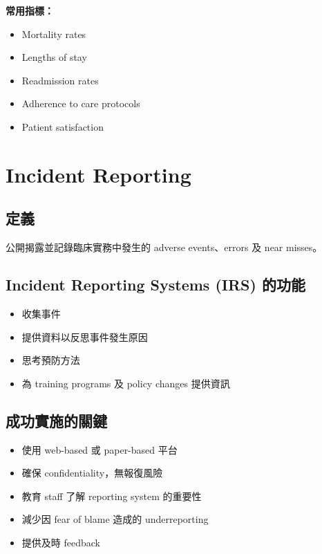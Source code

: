 \documentclass[12pt,a4paper]{article}
\begin{document}
\textbf{常用指標：}
\begin{itemize}
    \item Mortality rates
    \item Lengths of stay
    \item Readmission rates
    \item Adherence to care protocols
    \item Patient satisfaction
\end{itemize}

\section{Incident Reporting}

\subsection{定義}

公開揭露並記錄臨床實務中發生的 adverse events、errors 及 near misses。

\subsection{Incident Reporting Systems (IRS) 的功能}

\begin{itemize}
    \item 收集事件
    \item 提供資料以反思事件發生原因
    \item 思考預防方法
    \item 為 training programs 及 policy changes 提供資訊
\end{itemize}

\subsection{成功實施的關鍵}

\begin{itemize}
    \item 使用 web-based 或 paper-based 平台
    \item 確保 confidentiality，無報復風險
    \item 教育 staff 了解 reporting system 的重要性
    \item 減少因 fear of blame 造成的 underreporting
    \item 提供及時 feedback
\end{itemize}
\end{document}
